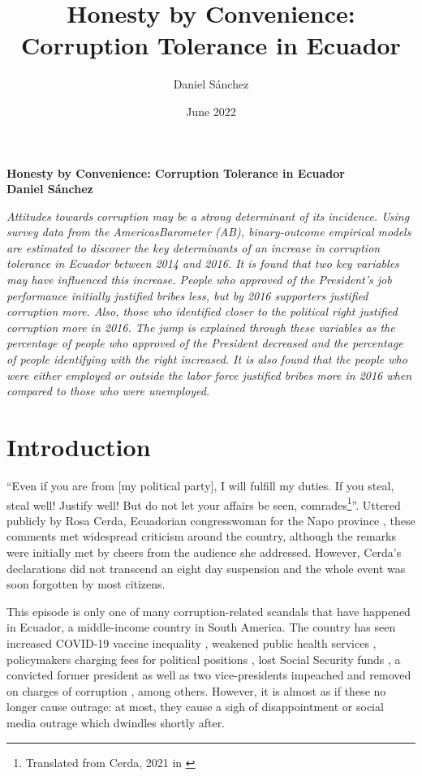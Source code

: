 \documentclass[12pt,a4]{article}\usepackage[]{graphicx}\usepackage[]{xcolor}
\title{Honesty by Convenience: Corruption Tolerance in Ecuador}
\author{Daniel Sánchez}
\date{June 2022}
\begin{document}





\begin{center}
\textbf{
Honesty by Convenience: Corruption Tolerance in Ecuador\\
Daniel Sánchez}
\end{center}

\textit{
Attitudes towards corruption may be a strong determinant of its incidence. Using survey
data from the AmericasBarometer (AB), binary-outcome empirical models are estimated to discover
the key determinants of an increase in corruption tolerance in Ecuador between 2014 and
2016. It is found that two key variables may have influenced this increase. People who approved
of the President’s job performance initially justified bribes less, but by 2016 supporters justified corruption more. Also, those who identified closer to the political right justified corruption more in 2016. The jump is explained through these variables as the percentage of people who approved of the President decreased and the percentage of people identifying with the right increased. It is also found that the people who were either employed or outside the labor force justified bribes more in 2016 when compared to those who were unemployed.}





\section{Introduction}
\enquote{Even if you are from [my political party], I will fulfill my duties. If you steal, steal well!  Justify well! But do not let your affairs be seen, comrades\footnote{Translated from Cerda, 2021 in \cite[para. 2]{PlanV.2021}}}. Uttered publicly by Rosa Cerda, Ecuadorian congresswoman for the Napo province \parencite{Castro.2021}, these comments met widespread criticism around the country, although the remarks were initially met by cheers from the audience she addressed. However, Cerda's declarations did not transcend an eight day suspension \parencite{Ordonez.2021} and the whole event was soon forgotten by most citizens. 

This episode is only one of many corruption-related scandals that have happened in Ecuador, a middle-income country in South America. The country has seen increased COVID-19 vaccine inequality \parencite{Taj.2021}, weakened public health services \parencite{Celi.2020}, policymakers charging fees for political positions \parencite{Espinosa.2021}, lost Social Security funds \parencite{Pesantes.9152020}, a convicted former president as well as two vice-presidents impeached and removed on charges of corruption \parencite{Cabrera.2020}, among others. However, it is almost as if these no longer cause outrage: at most, they cause a sigh of disappointment or social media outrage which dwindles shortly after.
\end{document}
